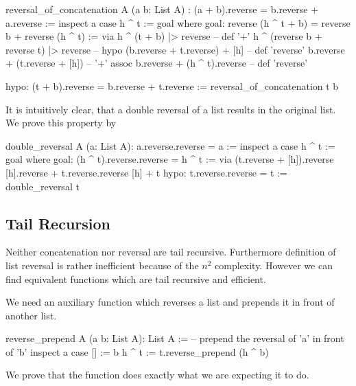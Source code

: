 \begin{alba}
  reversal_of_concatenation
    A
    (a b: List A)
    : (a + b).reverse = b.reverse + a.reverse :=
      inspect a case
        h ^ t :=
          goal where
             goal: reverse (h ^ t + b) = reverse b + reverse (h ^ t) :=
               via
                 h ^ (t + b) |> reverse                     -- def '+'
                 h ^ (reverse b + reverse t) |> reverse     -- hypo
                 (b.reverse + t.reverse) + [h]              -- def 'reverse'
                 b.reverse + (t.reverse + [h])              -- '+' assoc
                 b.reverse + (h ^ t).reverse                -- def 'reverse'

             hypo: (t + b).reverse = b.reverse + t.reverse :=
               reversal_of_concatenation t b
\end{alba}


It is intuitively clear, that a double reversal of a list results in the
original list. We prove this property by
%
\begin{alba}
  double_reversal A (a: List A): a.reverse.reverse = a :=
    inspect a case
      h ^ t :=
        goal where
          goal: (h ^ t).reverse.reverse = h ^ t :=
            via
              (t.reverse + [h]).reverse
              [h].reverse + t.reverse.reverse
              [h] + t
          hypo: t.reverse.reverse = t :=
            double_reversal t
\end{alba}



\subsection{Tail Recursion}

Neither concatenation nor reversal are tail recursive. Furthermore definition
of list reversal is rather inefficient because of the $n^2$
complexity. However we can find equivalent functions which are tail recursive
and efficient.

We need an auxiliary function which reverses a list and prepends it in front
of another list.

\begin{alba}
  reverse_prepend A (a b: List A): List A :=
      -- prepend the reversal of 'a' in front of 'b'
    inspect
      a
    case
      [] :=
        b
      h ^ t :=
        t.reverse_prepend (h ^ b)
\end{alba}


We prove that the function does exactly what we are expecting it to do.

